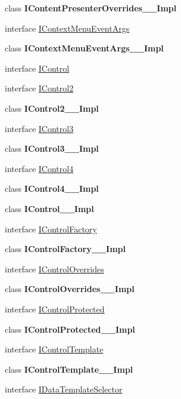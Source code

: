 \begin{DoxyCompactItemize}
\item 
class {\bfseries I\+Content\+Presenter\+Overrides\+\_\+\+\_\+\+Impl}
\item 
interface \hyperlink{interface_windows_1_1_u_i_1_1_xaml_1_1_controls_1_1_i_context_menu_event_args}{I\+Context\+Menu\+Event\+Args}
\item 
class {\bfseries I\+Context\+Menu\+Event\+Args\+\_\+\+\_\+\+Impl}
\item 
interface \hyperlink{interface_windows_1_1_u_i_1_1_xaml_1_1_controls_1_1_i_control}{I\+Control}
\item 
interface \hyperlink{interface_windows_1_1_u_i_1_1_xaml_1_1_controls_1_1_i_control2}{I\+Control2}
\item 
class {\bfseries I\+Control2\+\_\+\+\_\+\+Impl}
\item 
interface \hyperlink{interface_windows_1_1_u_i_1_1_xaml_1_1_controls_1_1_i_control3}{I\+Control3}
\item 
class {\bfseries I\+Control3\+\_\+\+\_\+\+Impl}
\item 
interface \hyperlink{interface_windows_1_1_u_i_1_1_xaml_1_1_controls_1_1_i_control4}{I\+Control4}
\item 
class {\bfseries I\+Control4\+\_\+\+\_\+\+Impl}
\item 
class {\bfseries I\+Control\+\_\+\+\_\+\+Impl}
\item 
interface \hyperlink{interface_windows_1_1_u_i_1_1_xaml_1_1_controls_1_1_i_control_factory}{I\+Control\+Factory}
\item 
class {\bfseries I\+Control\+Factory\+\_\+\+\_\+\+Impl}
\item 
interface \hyperlink{interface_windows_1_1_u_i_1_1_xaml_1_1_controls_1_1_i_control_overrides}{I\+Control\+Overrides}
\item 
class {\bfseries I\+Control\+Overrides\+\_\+\+\_\+\+Impl}
\item 
interface \hyperlink{interface_windows_1_1_u_i_1_1_xaml_1_1_controls_1_1_i_control_protected}{I\+Control\+Protected}
\item 
class {\bfseries I\+Control\+Protected\+\_\+\+\_\+\+Impl}
\item 
interface \hyperlink{interface_windows_1_1_u_i_1_1_xaml_1_1_controls_1_1_i_control_template}{I\+Control\+Template}
\item 
class {\bfseries I\+Control\+Template\+\_\+\+\_\+\+Impl}
\item 
interface \hyperlink{interface_windows_1_1_u_i_1_1_xaml_1_1_controls_1_1_i_data_template_selector}{I\+Data\+Template\+Selector}

\end{DoxyCompactItemize}

